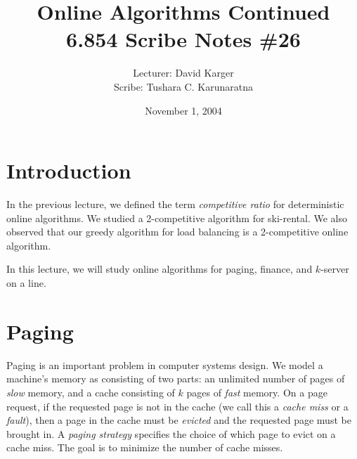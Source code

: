 \documentclass{article}
\title{Online Algorithms Continued\\6.854 Scribe Notes \#26}
\date{November 1, 2004}
\author{Lecturer: David Karger\\ Scribe: Tushara C. Karunaratna}
\begin{document}
%
%
%
%

%



\section{Introduction}
In the previous lecture, we defined the term \emph{competitive ratio}
for deterministic online algorithms.
We studied a 2-competitive algorithm for ski-rental.
We also observed that our greedy algorithm for load balancing is a
2-competitive online algorithm.

In this lecture, we will study online algorithms for paging, finance,
and $k$-server on a line.



\section{Paging}
Paging is an important problem in computer systems design.
We model a machine's memory as consisting of two parts: 
an unlimited number of pages of \emph{slow} memory, 
and a cache consisting of $k$ pages of \emph{fast} memory.
On a page request, if the requested page is not in the cache (we call
this a \emph{cache miss } or a \emph{fault}), then a
page in the cache must be \emph{evicted} and the requested page must
be brought in.
A \emph{paging strategy} specifies the choice of which page to evict
on a cache miss.
The goal is to minimize the number of cache misses.
\end{document}
